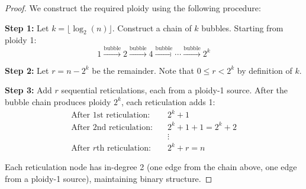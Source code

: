 \documentclass{article}
\begin{document}
\begin{proof}
We construct the required ploidy using the following procedure:

\textbf{Step 1:} Let $k = \lfloor \log_2(n) \rfloor$. Construct a chain of $k$ bubbles. Starting from ploidy 1:
\[1 \xrightarrow{\text{bubble}} 2 \xrightarrow{\text{bubble}} 4 \xrightarrow{\text{bubble}} \cdots \xrightarrow{\text{bubble}} 2^k\]

\textbf{Step 2:} Let $r = n - 2^k$ be the remainder. Note that $0 \leq r < 2^k$ by definition of $k$.

\textbf{Step 3:} Add $r$ sequential reticulations, each from a ploidy-1 source. After the bubble chain produces ploidy $2^k$, each reticulation adds 1:
\begin{align*}
    \text{After 1st reticulation:} \quad & 2^k + 1 \\
    \text{After 2nd reticulation:} \quad & 2^k + 1 + 1 = 2^k + 2 \\
    & \vdots \\
    \text{After $r$th reticulation:} \quad & 2^k + r = n
\end{align*}

Each reticulation node has in-degree 2 (one edge from the chain above, one edge from a ploidy-1 source), maintaining binary structure.
\end{proof}
\end{document}
